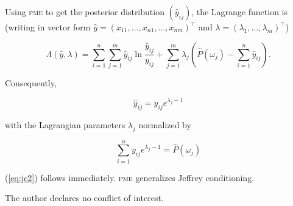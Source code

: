 \documentclass[entropy,article,accept,oneauthor,pdftex,12pt,a4paper]{mdpi}
\begin{document}
{\noindent}Using \textsc{pme} to get the posterior distribution
$(\hat{y}_{ij})$, the Lagrange function is (writing in vector form
$\hat{y}=(x_{11},\ldots,x_{n1},\ldots,x_{nm})^{\top}$ and
$\lambda=(\lambda_{1},\ldots,\lambda_{m})^{\top}$)

\begin{equation}
  \label{eq:jclag}
  \Lambda(\hat{y},\lambda)=\sum_{i=1}^{n}\sum_{j=1}^{m}\hat{y}_{ij}\ln\frac{\hat{y}_{ij}}{y_{ij}}+\sum_{j=1}^{m}\lambda_{j}\left(\hat{P}(\omega_{j})-\sum_{i=1}^{n}\hat{y}_{ij}\right).
\end{equation}

{\noindent}Consequently,

\begin{equation}
  \label{eq:jc4}
  \hat{y}_{ij}=y_{ij}e^{\lambda_{j}-1}
\end{equation}

{\noindent}with the Lagrangian parameters $\lambda_{j}$ normalized by

\begin{equation}
  \label{eq:jc5}
  \sum_{i=1}^{n}y_{ij}e^{\lambda_{j}-1}=\hat{P}(\omega_{j})
\end{equation}

{\noindent}(\ref{eq:jc2}) follows immediately. \textsc{pme}
generalizes Jeffrey conditioning.


The author declares no conflict of interest. 


 
 \makeatletter
 \renewcommand\@biblabel[1]{#1. }
 \makeatother
\end{document}
